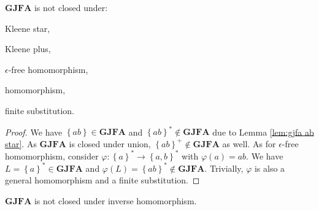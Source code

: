 \documentclass{ws-ijmpc}
\begin{document}
\begin{theorem}
$\mathbf{GJFA}$ is not closed under:\end{theorem}
\begin{romanlist}
\item Kleene star,
\item Kleene plus,
\item $\epsilon$-free homomorphism,
\item homomorphism,
\item finite substitution.\end{romanlist}
\begin{proof}
We have $\left\{ ab\right\} \in\mathbf{GJFA}$ and $\left\{ ab\right\} ^{*}\notin\mathbf{GJFA}$
due to Lemma \ref{lem:gjfa ab star}. As $\mathbf{GJFA}$ is closed
under union, $\left\{ ab\right\} ^{+}\notin\mathbf{GJFA}$ as well.
As for $\epsilon$-free homomorphism, consider $\varphi:\left\{ a\right\} ^{*}\rightarrow\left\{ a,b\right\} ^{*}$
with $\varphi\!\left(a\right)=ab$. We have $L=\left\{ a\right\} ^{*}\in\mathbf{GJFA}$
and $\varphi\!\left(L\right)=\left\{ ab\right\} ^{*}\notin\mathbf{GJFA}$.
Trivially, $\varphi$ is also a general homomorphism and a finite
substitution.\end{proof}
\begin{theorem}
\label{inv hom}$\mathbf{GJFA}$ is not closed under inverse homomorphism. \end{theorem}
\end{document}
